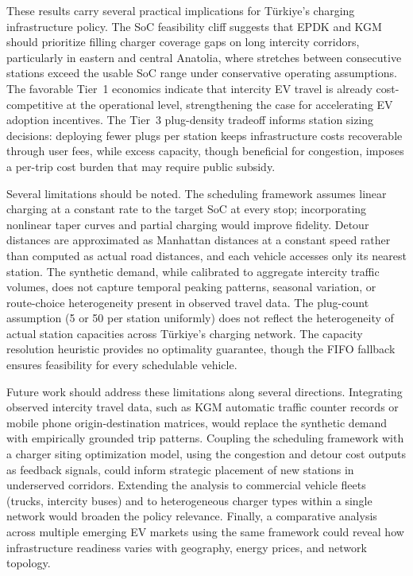 These results carry several practical implications for T\"{u}rkiye's charging infrastructure policy. The SoC feasibility cliff suggests that EPDK and KGM should prioritize filling charger coverage gaps on long intercity corridors, particularly in eastern and central Anatolia, where stretches between consecutive stations exceed the usable SoC range under conservative operating assumptions. The favorable Tier~1 economics indicate that intercity EV travel is already cost-competitive at the operational level, strengthening the case for accelerating EV adoption incentives. The Tier~3 plug-density tradeoff informs station sizing decisions: deploying fewer plugs per station keeps infrastructure costs recoverable through user fees, while excess capacity, though beneficial for congestion, imposes a per-trip cost burden that may require public subsidy.

Several limitations should be noted. The scheduling framework assumes linear charging at a constant rate to the target SoC at every stop; incorporating nonlinear taper curves and partial charging would improve fidelity. Detour distances are approximated as Manhattan distances at a constant speed rather than computed as actual road distances, and each vehicle accesses only its nearest station. The synthetic demand, while calibrated to aggregate intercity traffic volumes, does not capture temporal peaking patterns, seasonal variation, or route-choice heterogeneity present in observed travel data. The plug-count assumption (5 or 50 per station uniformly) does not reflect the heterogeneity of actual station capacities across T\"{u}rkiye's charging network. The capacity resolution heuristic provides no optimality guarantee, though the FIFO fallback ensures feasibility for every schedulable vehicle.

Future work should address these limitations along several directions. Integrating observed intercity travel data, such as KGM automatic traffic counter records or mobile phone origin-destination matrices, would replace the synthetic demand with empirically grounded trip patterns. Coupling the scheduling framework with a charger siting optimization model, using the congestion and detour cost outputs as feedback signals, could inform strategic placement of new stations in underserved corridors. Extending the analysis to commercial vehicle fleets (trucks, intercity buses) and to heterogeneous charger types within a single network would broaden the policy relevance. Finally, a comparative analysis across multiple emerging EV markets using the same framework could reveal how infrastructure readiness varies with geography, energy prices, and network topology.

